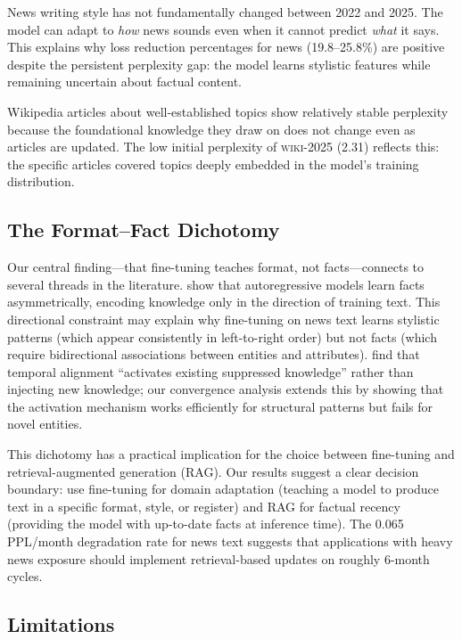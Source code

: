  News writing style has not fundamentally changed between 2022 and 2025. The model can adapt to \emph{how} news sounds even when it cannot predict \emph{what} it says. This explains why loss reduction percentages for news (19.8--25.8\%) are positive despite the persistent perplexity gap: the model learns stylistic features while remaining uncertain about factual content.

 Wikipedia articles about well-established topics show relatively stable perplexity because the foundational knowledge they draw on does not change even as articles are updated. The low initial perplexity of \textsc{wiki-2025} (2.31) reflects this: the specific articles covered topics deeply embedded in the model's training distribution.

\subsection{The Format--Fact Dichotomy}

Our central finding---that fine-tuning teaches format, not facts---connects to several threads in the literature. \citet{berglund2024reversal} show that autoregressive models learn facts asymmetrically, encoding knowledge only in the direction of training text. This directional constraint may explain why fine-tuning on news text learns stylistic patterns (which appear consistently in left-to-right order) but not facts (which require bidirectional associations between entities and attributes). \citet{zhao2024set} find that temporal alignment ``activates existing suppressed knowledge'' rather than injecting new knowledge; our convergence analysis extends this by showing that the activation mechanism works efficiently for structural patterns but fails for novel entities.

This dichotomy has a practical implication for the choice between fine-tuning and retrieval-augmented generation (RAG). Our results suggest a clear decision boundary: use fine-tuning for domain adaptation (teaching a model to produce text in a specific format, style, or register) and RAG for factual recency (providing the model with up-to-date facts at inference time). The 0.065 PPL/month degradation rate for news text suggests that applications with heavy news exposure should implement retrieval-based updates on roughly 6-month cycles.

\subsection{Limitations}
\label{sec:limitations}


